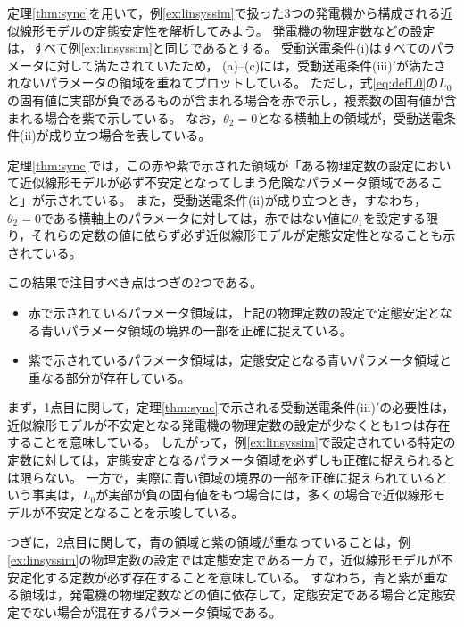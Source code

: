 \documentclass[tombow,dvipdfmx]{corona-a5-1.1}
\begin{document}
\begin{例}[受動送電条件に基づく定態安定性解析]\label{ex:linthm}
定理\ref{thm:sync}を用いて，例\ref{ex:linsyssim}で扱った3つの発電機から構成される近似線形モデルの定態安定性を解析してみよう。
発電機の物理定数などの設定は，すべて例\ref{ex:linsyssim}と同じであるとする。
受動送電条件(i)はすべてのパラメータに対して満たされていたため，
(a)--(c)には，受動送電条件(iii)$'$が満たされないパラメータの領域を重ねてプロットしている。
ただし，式\ref{eq:defL0}の$L_0$の固有値に実部が負であるものが含まれる場合を赤で示し，複素数の固有値が含まれる場合を紫で示している。
なお，$\theta_2=0$となる横軸上の領域が，受動送電条件(ii)が成り立つ場合を表している。

定理\ref{thm:sync}では，この赤や紫で示された領域が「ある物理定数の設定において近似線形モデルが必ず不安定となってしまう危険なパラメータ領域であること」が示されている。
また，受動送電条件(ii)が成り立つとき，すなわち，$\theta_2=0$である横軸上のパラメータに対しては，赤ではない値に$\theta_1$を設定する限り，それらの定数の値に依らず必ず近似線形モデルが定態安定性となることも示されている。

この結果で注目すべき点はつぎの2つである。
\begin{itemize}
\item 赤で示されているパラメータ領域は，上記の物理定数の設定で定態安定となる青いパラメータ領域の境界の一部を正確に捉えている。
\item 紫で示されているパラメータ領域は，定態安定となる青いパラメータ領域と重なる部分が存在している。
\end{itemize}
まず，1点目に関して，定理\ref{thm:sync}で示される受動送電条件(iii)$'$の必要性は，近似線形モデルが不安定となる発電機の物理定数の設定が少なくとも1つは存在することを意味している。
したがって，例\ref{ex:linsyssim}で設定されている特定の定数に対しては，定態安定となるパラメータ領域を必ずしも正確に捉えられるとは限らない。
一方で，実際に青い領域の境界の一部を正確に捉えられているという事実は，$L_0$が実部が負の固有値をもつ場合には，多くの場合で近似線形モデルが不安定となることを示唆している。

つぎに，2点目に関して，青の領域と紫の領域が重なっていることは，例\ref{ex:linsyssim}の物理定数の設定では定態安定である一方で，近似線形モデルが不安定化する定数が必ず存在することを意味している。
すなわち，青と紫が重なる領域は，発電機の物理定数などの値に依存して，定態安定である場合と定態安定でない場合が混在するパラメータ領域である。



\end{例}
\end{document}
